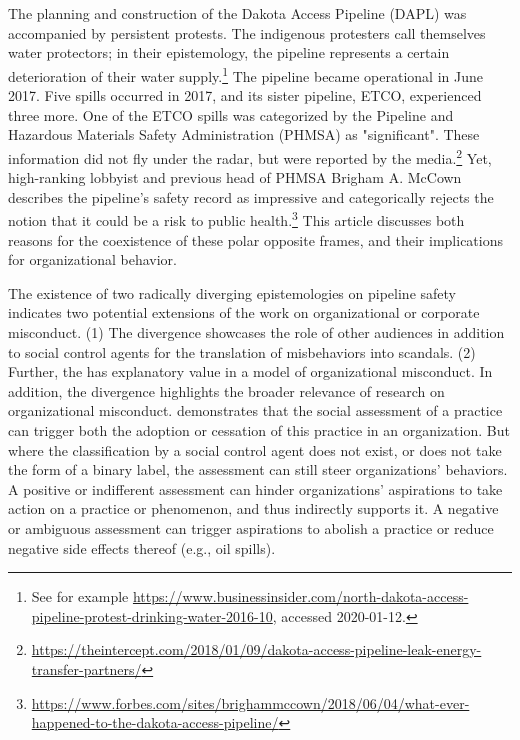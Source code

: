 \section{}

The planning and construction of the Dakota Access Pipeline (DAPL) was accompanied by persistent protests. The indigenous protesters call themselves water protectors; in their epistemology, the pipeline represents a certain deterioration of their water supply.\footnote{See for example \url{https://www.businessinsider.com/north-dakota-access-pipeline-protest-drinking-water-2016-10}, accessed 2020-01-12.} The pipeline became operational in June 2017. Five spills occurred in 2017, and its sister pipeline, ETCO, experienced three more. One of the ETCO spills was categorized by the Pipeline and Hazardous Materials Safety Administration (PHMSA) as "significant". These information did not fly under the radar, but were reported by the media.\footnote{\url{https://theintercept.com/2018/01/09/dakota-access-pipeline-leak-energy-transfer-partners/}} Yet, high-ranking lobbyist and previous head of PHMSA Brigham A. McCown describes the pipeline's safety record as impressive and categorically rejects the notion that it could be a risk to public health.\footnote{\url{https://www.forbes.com/sites/brighammccown/2018/06/04/what-ever-happened-to-the-dakota-access-pipeline/}} This article discusses both reasons for the coexistence of these polar opposite frames, and their implications for organizational behavior.

The existence of two radically diverging epistemologies on pipeline safety indicates two potential extensions of the work on organizational or corporate misconduct. (1) The divergence showcases the role of other audiences in addition to social control agents \citep{Greve2010} for the translation of misbehaviors into scandals. (2) Further, the  \citep{Carroll1998, Dillon2008} has explanatory value in a model of organizational misconduct.  In addition, the divergence highlights the broader relevance of research on organizational misconduct. \citet{Mohliver2019} demonstrates that the social assessment of a practice can trigger both the adoption or cessation of this practice in an organization. But where the classification by a social control agent does not exist, or does not take the form of a binary label, the assessment can still steer organizations' behaviors. A positive or indifferent assessment can hinder organizations' aspirations to take action on a practice or phenomenon, and thus indirectly supports it. A negative or ambiguous assessment can trigger aspirations to abolish a practice or reduce negative side effects thereof (e.g., oil spills).

